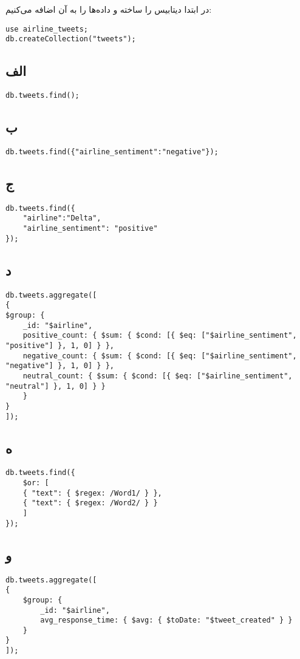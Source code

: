 در ابتدا دیتابیس را ساخته و داده‌ها را به آن اضافه می‌کنیم:

\setLTR
\begin{lstlisting}
use airline_tweets;
db.createCollection("tweets");
\end{lstlisting}
\setRTL

\subsection*{الف}
\setLTR
\begin{lstlisting}
db.tweets.find();
\end{lstlisting}
\setRTL
\subsection*{ب}
\setLTR
\begin{lstlisting}
db.tweets.find({"airline_sentiment":"negative"});
\end{lstlisting}
\setRTL
\subsection*{ج}
\setLTR
\begin{lstlisting}
db.tweets.find({
	"airline":"Delta",
	"airline_sentiment": "positive"
});
\end{lstlisting}
\setRTL
\subsection*{د}
\setLTR
\begin{lstlisting}
db.tweets.aggregate([
{
$group: {
	_id: "$airline",
	positive_count: { $sum: { $cond: [{ $eq: ["$airline_sentiment", "positive"] }, 1, 0] } },
	negative_count: { $sum: { $cond: [{ $eq: ["$airline_sentiment", "negative"] }, 1, 0] } },
	neutral_count: { $sum: { $cond: [{ $eq: ["$airline_sentiment", "neutral"] }, 1, 0] } }
	}
}
]);
\end{lstlisting}
\setRTL
\subsection*{ه}
\setLTR
\begin{lstlisting}
db.tweets.find({
	$or: [
	{ "text": { $regex: /Word1/ } },
	{ "text": { $regex: /Word2/ } }
	]
});	
\end{lstlisting}
\setRTL
\subsection*{و}
\setLTR
\begin{lstlisting}
db.tweets.aggregate([
{
	$group: {
		_id: "$airline",
		avg_response_time: { $avg: { $toDate: "$tweet_created" } }
	}
}
]);	
\end{lstlisting}
\setRTL